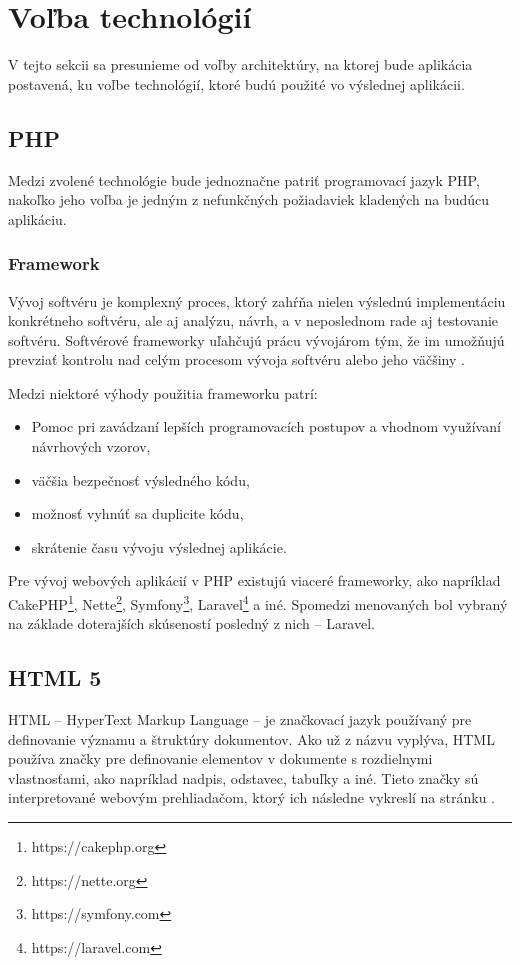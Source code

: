 \section{Voľba technológií}
V tejto sekcii sa presunieme od voľby architektúry, na ktorej bude aplikácia postavená, ku voľbe technológií, ktoré budú použité vo výslednej aplikácii.

\subsection{PHP}
Medzi zvolené technológie bude jednoznačne patriť programovací jazyk PHP, nakoľko jeho voľba je jedným z nefunkčných požiadaviek kladených na budúcu aplikáciu. 

\subsubsection*{Framework}
Vývoj softvéru je komplexný proces, ktorý zahŕňa nielen výslednú implementáciu konkrétneho softvéru, ale aj analýzu, návrh, a v neposlednom rade aj testovanie softvéru. Softvérové frameworky uľahčujú prácu vývojárom tým, že im umožňujú prevziať kontrolu nad celým procesom vývoja softvéru alebo jeho väčšiny \cite{co-je-framework}.

Medzi niektoré výhody použitia frameworku patrí:

\begin{itemize}
	\item Pomoc pri zavádzaní lepších programovacích postupov a vhodnom využívaní návrhových vzorov,
	\item väčšia bezpečnosť výsledného kódu,
	\item možnosť vyhnúť sa duplicite kódu,
	\item skrátenie času vývoju výslednej aplikácie.
\end{itemize}

Pre vývoj webových aplikácií v PHP existujú viaceré frameworky, ako napríklad CakePHP\footnote{https://cakephp.org}, Nette\footnote{https://nette.org}, Symfony\footnote{https://symfony.com}, Laravel\footnote{https://laravel.com} a iné.
Spomedzi menovaných bol vybraný na základe doterajších skúseností posledný z nich -- Laravel.

\subsection{HTML 5}
HTML -- HyperText Markup Language -- je značkovací jazyk používaný pre definovanie významu a štruktúry dokumentov. Ako už z názvu vyplýva, HTML používa značky pre definovanie elementov v dokumente s rozdielnymi vlastnosťami, ako napríklad nadpis, odstavec, tabuľky a iné.
Tieto značky sú interpretované webovým prehliadačom, ktorý ich následne vykreslí na stránku \cite{co-je-html}.

